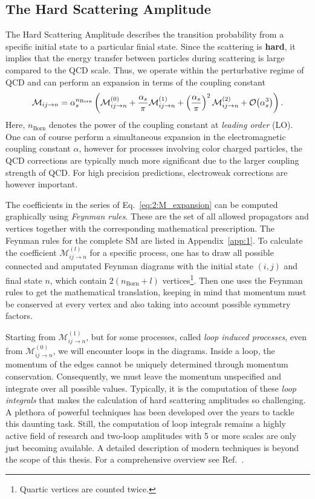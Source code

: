 \subsection{The Hard Scattering Amplitude}
The Hard Scattering Amplitude describes the transition probability from a specific initial state to a particular finial state. Since the scattering is \textbf{hard}, it implies that the energy transfer between particles during scattering is large compared to the \acs{QCD} scale. Thus, we operate within the perturbative regime of \acs{QCD} and can perform an expansion in terms of the coupling constant
\begin{equation}
\mathcal{M}_{ij \rightarrow n} = \alpha_s^{n_\text{Born}} \left( \mathcal{M}_{ij \rightarrow n}^{(0)} + \frac{\alpha_s}{\pi} \mathcal{M}_{ij \rightarrow n}^{(1)} + \left(\frac{\alpha_s}{\pi}\right)^2 \mathcal{M}_{ij \rightarrow n}^{(2)} + \mathcal{O}\!\left(\alpha_s^3\right) \right).
\label{eq:2:M_expansion}
\end{equation}
Here, $n_\text{Born}$ denotes the power of the coupling constant at \textit{leading order} (\acs{LO}). One can of course perform a simultaneous expansion in the electromagnetic coupling constant $\alpha$, however for processes involving color charged particles, the \acs{QCD} corrections are typically much more significant due to the larger coupling strength of \acs{QCD}. For high precision predictions, electroweak corrections are however important.

The coefficients in the series of Eq.~\eqref{eq:2:M_expansion} can be computed graphically using \textit{Feynman rules}. These are the set of all allowed propagators and vertices together with the corresponding mathematical prescription. The Feynman rules for the complete \acs{SM} are listed in Appendix~\ref{app:1}. To calculate the coefficient $\mathcal{M}_{ij \rightarrow n}^{(l)}$ for a specific process, one has to draw all possible connected and amputated Feynman diagrams with the initial state $(i,j)$ and final state $n$, which contain $2(n_\text{Born} + l)$ vertices\footnote{Quartic vertices are counted twice.}. Then one uses the Feynman rules to get the mathematical translation, keeping in mind that momentum must be conserved at every vertex and also taking into account possible symmetry factors.

Starting from $\mathcal{M}^{(1)}_{ij \rightarrow n}$, but for some processes, called \textit{loop induced processes}, even from $\mathcal{M}^{(0)}_{ij \rightarrow n}$, we will encounter loops in the diagrams. Inside a loop, the momentum of the edges cannot be uniquely determined through momentum conservation. Consequently, we must leave the momentum unspecified and integrate over all possible values. Typically, it is the computation of these \textit{loop integrals} that makes the calculation of hard scattering amplitudes so challenging. A plethora of powerful techniques has been developed over the years to tackle this daunting task. Still, the computation of loop integrals remains a highly active field of research and two-loop amplitudes with 5 or more scales are only just becoming available. A detailed description of modern techniques is beyond the scope of this thesis. For a comprehensive overview see Ref.~\cite{Weinzierl:2022eaz}.

